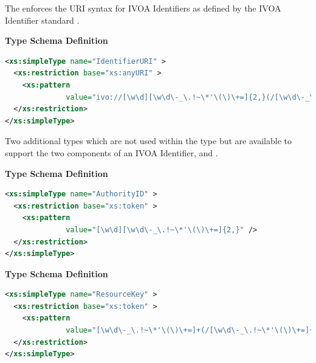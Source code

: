 \documentclass[11pt,a4paper]{ivoa}
\begin{document}
The  enforces the URI syntax for IVOA
Identifiers as defined by the IVOA Identifier standard
\citep{std:Identifiers}.

\begingroup
      	\renewcommand*\descriptionlabel[1]{%
      	\hbox to 5.5em{\emph{#1}\hfil}}\vspace{1ex}\noindent\textbf{ Type Schema Definition}

\begin{lstlisting}[language=XML,basicstyle=\footnotesize]
<xs:simpleType name="IdentifierURI" >
  <xs:restriction base="xs:anyURI" >
    <xs:pattern
              value="ivo://[\w\d][\w\d\-_\.!~\*'\(\)\+=]{2,}(/[\w\d\-_\.!~\*'\(\)\+=]+(/[\w\d\-_\.!~\*'\(\)\+=]+)*)?" />
  </xs:restriction>
</xs:simpleType>
\end{lstlisting}\endgroup



Two additional types which are not used within the
 type but are available to support the two
components of an IVOA Identifier,
 and .  


\begingroup
      	\renewcommand*\descriptionlabel[1]{%
      	\hbox to 5.5em{\emph{#1}\hfil}}\vspace{1ex}\noindent\textbf{ Type Schema Definition}

\begin{lstlisting}[language=XML,basicstyle=\footnotesize]
<xs:simpleType name="AuthorityID" >
  <xs:restriction base="xs:token" >
    <xs:pattern
              value="[\w\d][\w\d\-_\.!~\*'\(\)\+=]{2,}" />
  </xs:restriction>
</xs:simpleType>
\end{lstlisting}\endgroup

\begingroup
      	\renewcommand*\descriptionlabel[1]{%
      	\hbox to 5.5em{\emph{#1}\hfil}}\vspace{1ex}\noindent\textbf{ Type Schema Definition}

\begin{lstlisting}[language=XML,basicstyle=\footnotesize]
<xs:simpleType name="ResourceKey" >
  <xs:restriction base="xs:token" >
    <xs:pattern
              value="[\w\d\-_\.!~\*'\(\)\+=]+(/[\w\d\-_\.!~\*'\(\)\+=]+)*" />
  </xs:restriction>
</xs:simpleType>
\end{lstlisting}\endgroup
\end{document}
